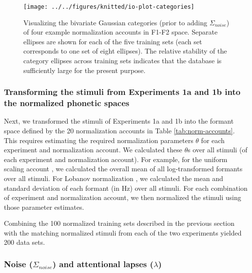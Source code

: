 \documentclass[preprint]{JASA}
\begin{document}
\begin{figure}[!ht]

{\centering \texttt{[image: ../../figures/knitted/io-plot-categories]} 

}

\caption{Visualizing the bivariate Gaussian categories (prior to adding \(\Sigma_{noise}\)) of four example normalization accounts in F1-F2 space. Separate ellipses are shown for each of the five training sets (each set corresponds to one set of eight ellipses). The relative stability of the category ellipses across training sets indicates that the database is sufficiently large for the present purpose.}\label{fig:io-plot-categories}
\end{figure}

\subsubsection{Transforming the stimuli from Experiments 1a and 1b into the normalized phonetic spaces}\label{transforming-the-stimuli-from-experiments-1a-and-1b-into-the-normalized-phonetic-spaces}

Next, we transformed the stimuli of Experiments 1a and 1b into the formant space defined by the 20 normalization accounts in Table \ref{tab:norm-accounts}. This requires estimating the required normalization parameters \(\theta\) for each experiment and normalization account. We calculated these \(\theta\)s over all stimuli (of each experiment and normalization account). For example, for the uniform scaling account \citep{nearey1978}, we calculated the overall mean of all log-transformed formants over all stimuli. For Lobanov normalization \citep{lobanov1971}, we calculated the mean and standard deviation of each formant (in Hz) over all stimuli. For each combination of experiment and normalization account, we then normalized the stimuli using those parameter estimates.

Combining the 100 normalized training sets described in the previous section with the matching normalized stimuli from each of the two experiments yielded 200 data sets.

\subsubsection{\texorpdfstring{Noise (\(\Sigma_{noise}\)) and attentional lapses (\(\lambda\))}{Noise (\textbackslash Sigma\_\{noise\}) and attentional lapses (\textbackslash lambda)}}\label{noise-sigma_noise-and-attentional-lapses-lambda}
\end{document}
